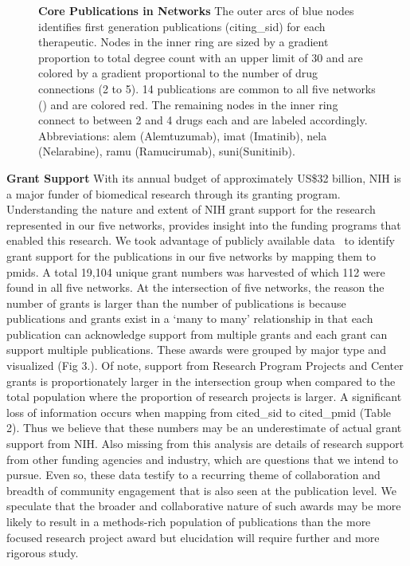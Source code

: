 \documentclass[10pt,letterpaper]{article}
\begin{document}
\begin{figure}[!h]
\centering
\caption{{\bf Core Publications in Networks}  The outer arcs of blue nodes identifies first generation publications (citing\_sid) for each therapeutic. Nodes in the inner ring are sized by a gradient proportion to total degree count with an upper limit of 30 and are colored by a gradient proportional to the number of drug connections (2 to 5). 14  publications are common to all five networks () and are colored red. The remaining nodes in the inner ring connect to between 2 and 4 drugs each and are labeled accordingly. Abbreviations: alem (Alemtuzumab), imat (Imatinib), nela (Nelarabine), ramu (Ramucirumab), suni(Sunitinib).}
\label{fig2}
\end{figure}

\textbf{Grant Support} With its annual budget of approximately US\$32 billion, NIH is a major funder of biomedical research through its granting program. Understanding the nature and extent of NIH grant support for the research represented in our five networks, provides insight into the funding programs that enabled this research. We took advantage of publicly available data~\cite{bibNIHExPORTER} to identify grant support for the publications in our five networks by mapping them to pmids. A total 19,104 unique grant numbers was harvested of which 112 were found in all five networks. At the intersection of five networks, the reason the number of grants is larger than the number of publications is because publications and grants exist in a `many to many' relationship in that each publication can acknowledge support from multiple grants and each grant can support multiple publications. These awards were grouped by major type  and visualized (Fig 3.). Of note, support from Research Program Projects and Center grants is proportionately larger in the intersection group when compared to the total population where the proportion of research projects is larger. A significant loss of information occurs when mapping from cited\_sid to cited\_pmid (Table 2). Thus we believe that these numbers may be an underestimate of actual grant support from NIH. Also missing from this analysis are details of research support from other funding agencies and industry, which are questions that we intend to pursue. Even so, these data testify to a recurring theme of collaboration and breadth of community engagement that is also seen at the publication level. We speculate that the broader and collaborative nature of such awards may be more likely to result in a methods-rich population of publications than the more focused research project award but elucidation will require further and more rigorous study. 
\end{document}
